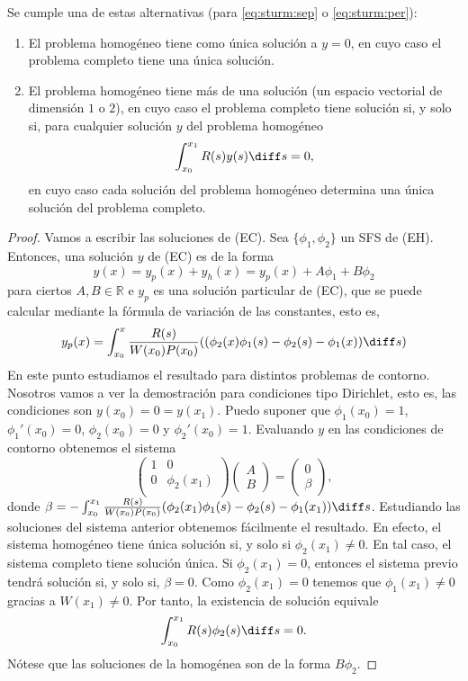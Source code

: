 \documentclass{article}
\begin{document}
\begin{thm}
  Se cumple una de estas alternativas (para \eqref{eq:sturm:sep} o \eqref{eq:sturm:per}):
  \begin{enumerate}
  \item El problema homogéneo tiene como única solución a $y = 0$, en cuyo caso el problema completo
    tiene una única solución.
  \item El problema homogéneo tiene más de una solución (un espacio vectorial de dimensión $1$ o
    $2$), en cuyo caso el problema completo tiene solución si, y solo si, para cualquier solución
    $y$ del problema homogéneo
    \[\int_{x_0}^{x_1}R(s) y(s) \diff s = 0,\]
    en cuyo caso cada solución del problema homogéneo determina una única solución del problema
    completo.
  \end{enumerate}
\end{thm}
\begin{proof}
  Vamos a escribir las soluciones de (EC). Sea $\{\phi_1, \phi_2\}$ un SFS de (EH). Entonces, una
  solución $y$ de (EC) es de la forma
  \[y(x) = y_p(x) + y_h(x) = y_p(x) + A \phi_1 + B\phi_2\] para ciertos $A, B \in \mathbb{R}$ e
  $y_p$ es una solución particular de (EC), que se puede calcular mediante la fórmula de variación
  de las constantes, esto es,
  \[y_p(x) = \int_{x_0}^x \frac{R(s)}{W(x_0) P(x_0)} ((\phi_2(x) \phi_1(s) - \phi_2(s) - \phi_1(x))
    \diff s)\] En este punto estudiamos el resultado para distintos problemas de contorno. Nosotros
  vamos a ver la demostración para condiciones tipo Dirichlet, esto es, las condiciones son
  $y(x_0) = 0 = y(x_1)$. Puedo suponer que $\phi_1(x_0) = 1$, $\phi_1'(x_0) = 0$, $\phi_2(x_0) = 0$
  y $\phi_2'(x_0) = 1$. Evaluando $y$ en las condiciones de contorno obtenemos el sistema
  \[\left(
      \begin{array}{cc}
        1 & 0 \\ 0 & \phi_2(x_1) \\
      \end{array}
    \right) \left(
      \begin{array}{c}
        A \\ B
      \end{array}
    \right) = \left(
      \begin{array}{c}
        0 \\ \beta
      \end{array}
    \right),
  \]
  donde
  $\beta = -\int_{x_0}^{x_1}\frac{R(s)}{W(x_0) P(x_0)}(\phi_2(x_1) \phi_1(s) - \phi_2(s) -
  \phi_1(x_1)) \diff s$. Estudiando las soluciones del sistema anterior obtenemos fácilmente el
  resultado. En efecto, el sistema homogéneo tiene única solución si, y solo si $\phi_2(x_1) \ne
  0$. En tal caso, el sistema completo tiene solución única. Si $\phi_2(x_1) = 0$, entonces el
  sistema previo tendrá solución si, y solo si, $\beta = 0$.  Como $\phi_2(x_1) = 0$ tenemos que
  $\phi_1(x_1) \ne 0$ gracias a $W(x_1) \ne 0$. Por tanto, la existencia de solución equivale
  \[\int_{x_0}^{x_1} R(s) \phi_2(s) \diff s = 0.\]
  Nótese que las soluciones de la homogénea son de la forma $B \phi_2$.
\end{proof}
\end{document}
